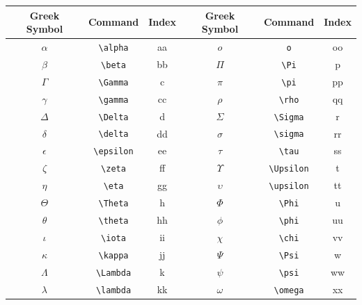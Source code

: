                 \begin{table}[!ht]
                    \centering
                    \begin{tabular}{c c c | c c c}
                        \hline
                        Greek Symbol\T\B  & Command     & Index & Greek Symbol\T\B  & Command     & Index \\
                        \hline
                        $\alpha$\T  & \verb+\alpha+     & aa    & $o$         & \verb+o+          & oo    \\
                        $\beta$     & \verb+\beta+      & bb    & $\Pi$       & \verb+\Pi+        & p     \\
                        $\Gamma$    & \verb+\Gamma+     & c     & $\pi$       & \verb+\pi+        & pp    \\
                        $\gamma$    & \verb+\gamma+     & cc    & $\rho$      & \verb+\rho+       & qq    \\
                        $\Delta$    & \verb+\Delta+     & d     & $\Sigma$    & \verb+\Sigma+     & r     \\
                        $\delta$    & \verb+\delta+     & dd    & $\sigma$    & \verb+\sigma+     & rr    \\
                        $\epsilon$  & \verb+\epsilon+   & ee    & $\tau$      & \verb+\tau+       & ss    \\
                        $\zeta$     & \verb+\zeta+      & ff    & $\Upsilon$  & \verb+\Upsilon+   & t     \\
                        $\eta$      & \verb+\eta+       & gg    & $\upsilon$  & \verb+\upsilon+   & tt    \\
                        $\Theta$    & \verb+\Theta+     & h     & $\Phi$      & \verb+\Phi+       & u     \\
                        $\theta$    & \verb+\theta+     & hh    & $\phi$      & \verb+\phi+       & uu    \\
                        $\iota$     & \verb+\iota+      & ii    & $\chi$      & \verb+\chi+       & vv    \\
                        $\kappa$    & \verb+\kappa+     & jj    & $\Psi$      & \verb+\Psi+       & w     \\
                        $\Lambda$   & \verb+\Lambda+    & k     & $\psi$      & \verb+\psi+       & ww    \\
                        $\lambda$   & \verb+\lambda+    & kk    & $\omega$    & \verb+\omega+     & xx    \\

\end{tabular}
\end{table}
